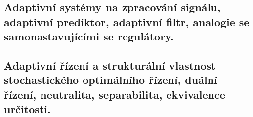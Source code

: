 \newpage
\subsection{Adaptivní systémy na zpracování signálu, adaptivní prediktor, adaptivní filtr, analogie se samonastavujícími se regulátory.}

\newpage
\subsection{Adaptivní řízení a strukturální vlastnost stochastického optimálního řízení, duální řízení, neutralita, separabilita, ekvivalence určitosti.}